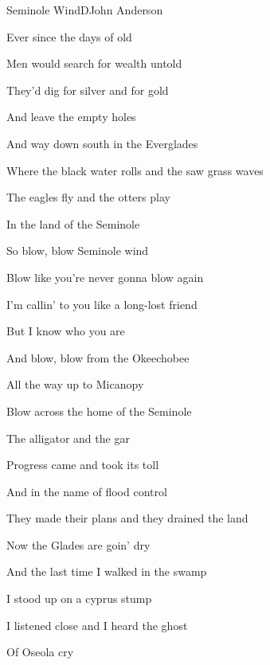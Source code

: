 \begin{song}{Seminole Wind}{D}{John Anderson}

\begin{SBVerse}

\Ch{[emi,G,D,A]}{}

Ever since the days of old

Men would search for wealth untold

They'd dig for silver and for gold

And leave the empty holes

And way down south in the Everglades

Where the black water rolls and the saw grass waves

The eagles fly and the otters play

In the land of the Seminole

\end{SBVerse}

\begin{SBChorus}

So blow, blow Seminole wind

Blow like you're never gonna blow again

I'm callin' to you like a long-lost friend

But I know who you are

And blow, blow from the Okeechobee

All the way up to Micanopy

Blow across the home of the Seminole

The alligator and the gar

\end{SBChorus}

\begin{SBVerse}

Progress came and took its toll

And in the name of flood control

They made their plans and they drained the land

Now the Glades are goin' dry

And the last time I walked in the swamp

I stood up on a cyprus stump

I listened close and I heard the ghost

Of Oseola cry

\end{SBVerse}

\begin{SBChorus}

\end{SBChorus}

\end{song}

\clearpage